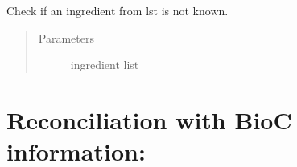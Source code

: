 \documentclass[letterpaper,10pt,english]{sphinxmanual}
\begin{document}
\begin{fulllineitems}
\begin{fulllineitems}
\begin{quote}
\begin{description}
\end{description}\end{quote}

\end{fulllineitems}


\begin{fulllineitems}
\label{\detokenize{api:ingredient_extractor.IngredientExtractor.whitelist_check}}
Check if an ingredient from lst is not known.
\begin{quote}\begin{description}
\item[{Parameters}] \leavevmode
{} \textendash{} ingredient list

\end{description}\end{quote}

\end{fulllineitems}


\end{fulllineitems}



\section{Reconciliation with BioC information:}
\label{\detokenize{api:reconciliation-with-bioc-information}}\label{\detokenize{api:module-bioc}}
\end{document}
